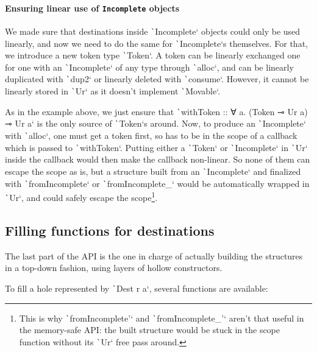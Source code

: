 \documentclass[english]{jflart}
\begin{document}
\paragraph{Ensuring linear use of \texttt{Incomplete} objects}

We made sure that destinations inside \texttt`Incomplete` objects could only be used linearly, and now we need to do the same for \texttt`Incomplete`s themselves. For that, we introduce a new token type \texttt`Token`. A token can be linearly exchanged one for one with an \texttt`Incomplete` of any type through \texttt`alloc`, and can be linearly duplicated with \texttt`dup2` or linearly deleted with \texttt`consume`. However, it cannot be linearly stored in \texttt`Ur` as it doesn't implement \texttt`Movable`.

As in the example above, we just ensure that \texttt`withToken :: ∀ a. (Token ⊸ Ur a) ⊸ Ur a` is the only source of \texttt`Token`s around. Now, to produce an \texttt`Incomplete` with \texttt`alloc`, one must get a token first, so has to be in the scope of a callback which is passed to \texttt`withToken`. Putting either a \texttt`Token` or \texttt`Incomplete` in \texttt`Ur` inside the callback would then make the callback non-linear. So none of them can escape the scope as is, but a structure built from an \texttt`Incomplete` and finalized with \texttt`fromIncomplete` or \texttt`fromIncomplete_` would be automatically wrapped in \texttt`Ur`, and could safely escape the scope\footnote{This is why \texttt`fromIncomplete'` and \texttt`fromIncomplete_'` aren't that useful in the memory-safe API: the built structure would be stuck in the scope function without its \texttt`Ur` free pass around.}.

\subsection{Filling functions for destinations}

The last part of the API is the one in charge of actually building the structures in a top-down fashion, using layers of hollow constructors. 

To fill a hole represented by \texttt`Dest r a`, several functions are available:
\end{document}
